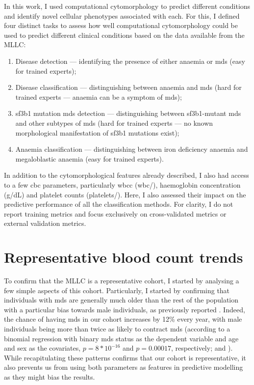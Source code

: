 In this work, I used computational cytomorphology to predict different conditions and identify novel cellular phenotypes associated with each. For this, I defined four distinct tasks to assess how well computational cytomorphology could be used to predict different clinical conditions based on the data available from the MLLC:

\begin{enumerate}
    \item Disease detection --- identifying the presence of either anaemia or \ac{mds} (easy for trained experts);
    \item Disease classification --- distinguishing between anaemia and \ac{mds} (hard for trained experts --- anaemia can be a symptom of \ac{mds});
    \item \ac{sf3b1} mutation \ac{mds} detection --- distinguishing between \ac{sf3b1}-mutant \ac{mds} and other subtypes of \ac{mds} (hard for trained experts --- no known morphological manifestation of \ac{sf3b1} mutations exist);
    \item Anaemia classification --- distinguishing between iron deficiency anaemia and megaloblastic anaemia (easy for trained experts).
\end{enumerate}

In addition to the cytomorphological features already described, I also had access to a few \ac{cbc} parameters, particularly \ac{wbcc} (\ac{wbc}/\Mum), haemoglobin concentration (g/dL) and platelet counts (platelets/\Mum). Here, I also assessed their impact on the predictive performance of all the classification methods. For clarity, I do not report training metrics and focus exclusively on cross-validated metrics or external validation metrics.

\section{Representative blood count trends}

To confirm that the MLLC is a representative cohort, I started by analysing a few simple aspects of this cohort. Particularly, I started by confirming that individuals with \ac{mds} are generally much older than the rest of the population with a particular bias towards male individuals, as previously reported \cite{Rollison2008-yg}. Indeed, the chance of having \ac{mds} in our cohort increases by 12\% every year, with male individuals being more than twice as likely to contract \ac{mds} (according to a binomial regression with binary \ac{mds} status as the dependent variable and age and sex as the covariates, $p=8*10^{-16}$ and $p=0.00017$, respectively;  and ). While recapitulating these patterns confirms that our cohort is representative, it also prevents us from using both parameters as features in predictive modelling as they might bias the results.

